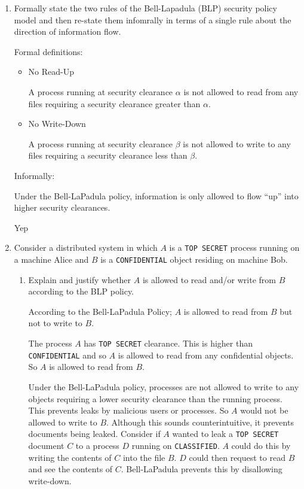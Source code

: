 \documentclass[10pt,\jkfside,a4paper]{article}
\begin{document}
\begin{enumerate}

\item Formally state the two rules of the Bell-Lapadula (BLP) security policy model 
and then re-state them infomrally in terms of a single rule about the direction of information flow.

Formal definitions:

\begin{itemize}

\item No Read-Up

A process running at security clearance $\alpha$ is not allowed to read from any files requiring a 
security clearance greater than $\alpha$.

\item No Write-Down

A process running at security clearance $\beta$ is not allowed to write to any files requiring a 
security clearance less than $\beta$.

\end{itemize}

Informally:

Under the Bell-LaPadula policy, information is only allowed to flow ``up'' into higher 
security clearances.

{\color{blue} Yep}

\item Consider a distributed system in which $A$ is a \texttt{TOP SECRET} process running on a 
machine Alice and $B$ is a \texttt{CONFIDENTIAL} object residing on machine Bob.

\begin{enumerate}

\item Explain and justify whether $A$ is allowed to read and/or write from $B$ according to the BLP 
policy.

According to the Bell-LaPadula Policy; $A$ is allowed to read from $B$ but not to write to $B$.

The process $A$ has \texttt{TOP SECRET} clearance. This is higher than \texttt{CONFIDENTIAL} and so 
$A$ is allowed to read from any confidential objects. So $A$ is allowed to read from $B$.

Under the Bell-LaPadula policy, processes are not allowed to write to any objects requiring a lower security 
clearance than the running process. This prevents leaks by malicious users or processes. So $A$ would not be 
allowed to write to $B$. Although this sounds counterintuitive, it prevents documents being leaked. Consider if 
$A$ wanted to leak a \texttt{TOP SECRET} document $C$ to a process $D$ running on \texttt{CLASSIFIED}. $A$ could do 
this by writing the contents of $C$ into the file $B$. $D$ could then request to read $B$ and see the contents of $C$. 
Bell-LaPadula prevents this by disallowing write-down.


\end{enumerate}
\end{enumerate}
\end{document}
